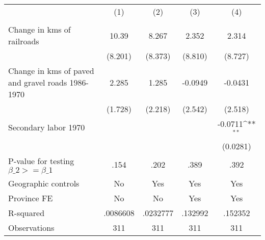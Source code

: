 {
\def\sym#1{\ifmmode^{#1}\else\(^{#1}\)\fi}
\begin{tabular}{l*{4}{c}}
\hline\hline
                &\multicolumn{1}{c}{(1)}&\multicolumn{1}{c}{(2)}&\multicolumn{1}{c}{(3)}&\multicolumn{1}{c}{(4)}\\
                &\multicolumn{1}{c}{}&\multicolumn{1}{c}{}&\multicolumn{1}{c}{}&\multicolumn{1}{c}{}\\
\hline
Change in kms of railroads&    10.39         &    8.267         &    2.352         &    2.314         \\
                &  (8.201)         &  (8.373)         &  (8.810)         &  (8.727)         \\
[1em]
Change in kms of paved and gravel roads 1986-1970&    2.285         &    1.285         &  -0.0949         &  -0.0431         \\
                &  (1.728)         &  (2.218)         &  (2.542)         &  (2.518)         \\
[1em]
Secondary labor 1970&                  &                  &                  &  -0.0711\sym{**} \\
                &                  &                  &                  & (0.0281)         \\
\hline
P-value for testing $\beta\_{2} >= \beta\_{1}$&     .154         &     .202         &     .389         &     .392         \\
Geographic controls&       No         &      Yes         &      Yes         &      Yes         \\
Province FE     &       No         &       No         &      Yes         &      Yes         \\
R-squared       & .0086608         & .0232777         &  .132992         &  .152352         \\
Observations    &      311         &      311         &      311         &      311         \\
\hline\hline
\end{tabular}
}
